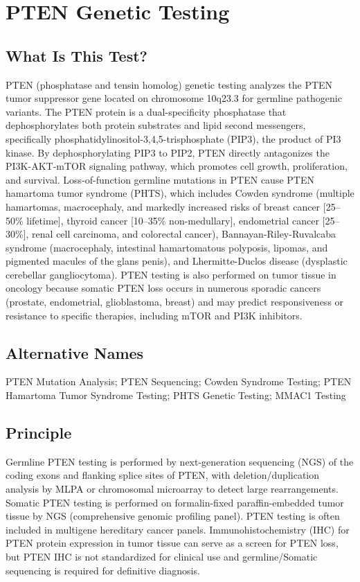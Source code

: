 \chapter{PTEN Genetic Testing}

\section*{What Is This Test?}
PTEN (phosphatase and tensin homolog) genetic testing analyzes the PTEN tumor suppressor gene located on chromosome 10q23.3 for germline pathogenic variants. The PTEN protein is a dual-specificity phosphatase that dephosphorylates both protein substrates and lipid second messengers, specifically phosphatidylinositol-3,4,5-trisphosphate (PIP3), the product of PI3 kinase. By dephosphorylating PIP3 to PIP2, PTEN directly antagonizes the PI3K-AKT-mTOR signaling pathway, which promotes cell growth, proliferation, and survival. Loss-of-function germline mutations in PTEN cause PTEN hamartoma tumor syndrome (PHTS), which includes Cowden syndrome (multiple hamartomas, macrocephaly, and markedly increased risks of breast cancer [25--50\% lifetime], thyroid cancer [10--35\% non-medullary], endometrial cancer [25--30\%], renal cell carcinoma, and colorectal cancer), Bannayan-Riley-Ruvalcaba syndrome (macrocephaly, intestinal hamartomatous polyposis, lipomas, and pigmented macules of the glans penis), and Lhermitte-Duclos disease (dysplastic cerebellar gangliocytoma). PTEN testing is also performed on tumor tissue in oncology because somatic PTEN loss occurs in numerous sporadic cancers (prostate, endometrial, glioblastoma, breast) and may predict responsiveness or resistance to specific therapies, including mTOR and PI3K inhibitors.

\section*{Alternative Names}
PTEN Mutation Analysis; PTEN Sequencing; Cowden Syndrome Testing; PTEN Hamartoma Tumor Syndrome Testing; PHTS Genetic Testing; MMAC1 Testing

\section*{Principle}
Germline PTEN testing is performed by next-generation sequencing (NGS) of the coding exons and flanking splice sites of PTEN, with deletion/duplication analysis by MLPA or chromosomal microarray to detect large rearrangements. Somatic PTEN testing is performed on formalin-fixed paraffin-embedded tumor tissue by NGS (comprehensive genomic profiling panel). PTEN testing is often included in multigene hereditary cancer panels. Immunohistochemistry (IHC) for PTEN protein expression in tumor tissue can serve as a screen for PTEN loss, but PTEN IHC is not standardized for clinical use and germline/Somatic sequencing is required for definitive diagnosis.

